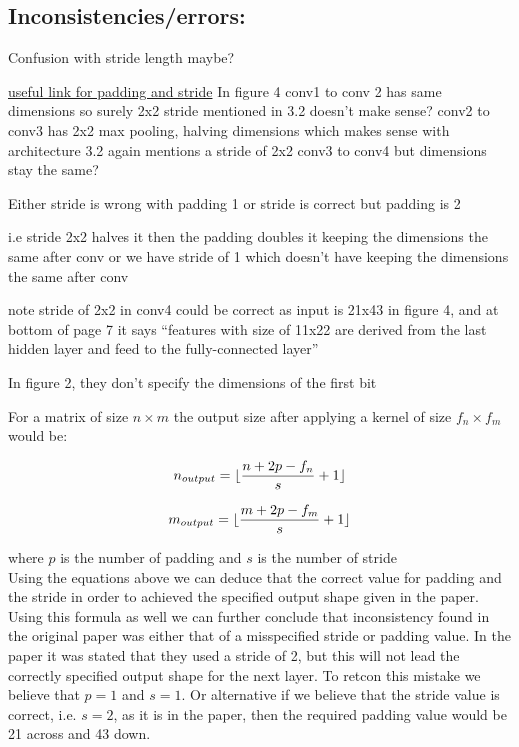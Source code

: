 \documentclass[conference]{IEEEtran}
\DeclarePairedDelimiter\floor{\lfloor}{\rfloor}
\begin{document}
\subsection{Inconsistencies/errors:}



Confusion with stride length maybe?

\href{https://machinelearningmastery.com/padding-and-stride-for-convolutional-neural-networks/}{useful link for padding and stride}
In figure 4 conv1 to conv 2 has same dimensions so surely 2x2 stride mentioned in 3.2 doesn't make sense?
conv2 to conv3 has 2x2 max pooling, halving dimensions which makes sense with architecture
3.2 again mentions a stride of 2x2 conv3 to conv4 but dimensions stay the same?

Either stride is wrong with padding 1 or stride is correct but padding is 2

i.e stride 2x2 halves it then the padding doubles it keeping the dimensions the same after conv
or we have stride of 1 which doesn't have keeping the dimensions the same after conv

note stride of 2x2 in conv4 could be correct as input is 21x43 in figure 4, and at bottom of page 7 it says ``features with size of 11x22 are derived from the last hidden layer and feed to the fully-connected layer''

In figure 2, they don't specify the dimensions of the first bit

For a matrix of size $n\times m$ the output size after applying a kernel of size $f_{n}\times f_{m}$ would be:

\begin{equation}
    n_{output} = \floor{\frac{n+2p-f_{n}}{s} + 1}
\end{equation}

\begin{equation}
    m_{output} = \floor{\frac{m+2p-f_{m}}{s} + 1}
\end{equation}

where $p$ is the number of padding and $s$ is the number of stride
\\

Using the equations above we can deduce that the correct value for padding and the stride in order to achieved the specified output shape given in the paper. Using this formula as well we can further conclude that inconsistency found in the original paper was either that of a misspecified stride or padding value. In the paper it was stated that they used a stride of 2, but this will not lead the correctly specified output shape for the next layer. To retcon this mistake we believe that $p=1$ and $s=1$. Or alternative if we believe that the stride value is correct, i.e. $s=2$, as it is in the paper, then the required padding value would be 21 across and 43 down.
\end{document}
